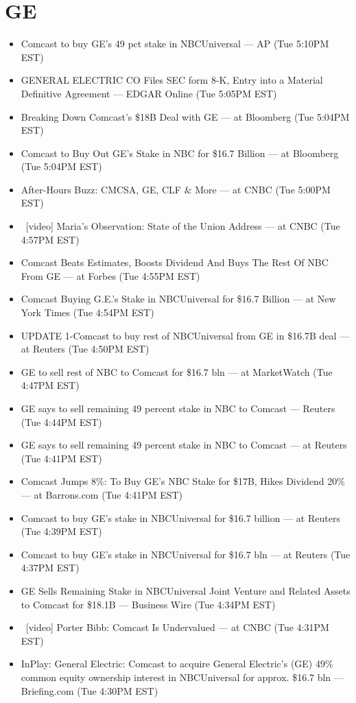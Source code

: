 \documentclass[11pt,asymmetric]{article}
\begin{document}
\section*{GE}
\begin{itemize}
\item Comcast to buy GE's 49 pct stake in NBCUniversal --- AP (Tue 5:10PM EST)
\item GENERAL ELECTRIC CO Files SEC form 8-K, Entry into a Material Definitive Agreement --- EDGAR Online (Tue 5:05PM EST)
\item Breaking Down Comcast's \$18B Deal with GE --- at Bloomberg (Tue 5:04PM EST)
\item Comcast to Buy Out GE’s Stake in NBC for \$16.7 Billion --- at Bloomberg (Tue 5:04PM EST)
\item After-Hours Buzz: CMCSA, GE, CLF \& More --- at CNBC (Tue 5:00PM EST)
\item\ [video] Maria's Observation: State of the Union Address --- at CNBC (Tue 4:57PM EST)
\item Comcast Beats Estimates, Boosts Dividend And Buys The Rest Of NBC From GE --- at Forbes (Tue 4:55PM EST)
\item Comcast Buying G.E.'s Stake in NBCUniversal for \$16.7 Billion --- at New York Times (Tue 4:54PM EST)
\item UPDATE 1-Comcast to buy rest of NBCUniversal from GE in \$16.7B deal --- at Reuters (Tue 4:50PM EST)
\item GE to sell rest of NBC to Comcast for \$16.7 bln --- at MarketWatch (Tue 4:47PM EST)
\item GE says to sell remaining 49 percent stake in NBC to Comcast --- Reuters (Tue 4:44PM EST)
\item GE says to sell remaining 49 percent stake in NBC to Comcast --- at Reuters (Tue 4:41PM EST)
\item Comcast Jumps 8\%: To Buy GE's NBC Stake for \$17B, Hikes Dividend 20\% --- at Barrons.com (Tue 4:41PM EST)
\item Comcast to buy GE's stake in NBCUniversal for \$16.7 billion --- at Reuters (Tue 4:39PM EST)
\item Comcast to buy GE's stake in NBCUniversal for \$16.7 bln --- at Reuters (Tue 4:37PM EST)
\item GE Sells Remaining Stake in NBCUniversal Joint Venture and Related Assets to Comcast for \$18.1B --- Business Wire (Tue 4:34PM EST)
\item\ [video] Porter Bibb: Comcast Is Undervalued --- at CNBC (Tue 4:31PM EST)
\item InPlay: General Electric: Comcast to acquire General Electric's (GE) 49\% common equity ownership interest in NBCUniversal for approx. \$16.7 bln --- Briefing.com (Tue 4:30PM EST)

\end{itemize}
\end{document}
